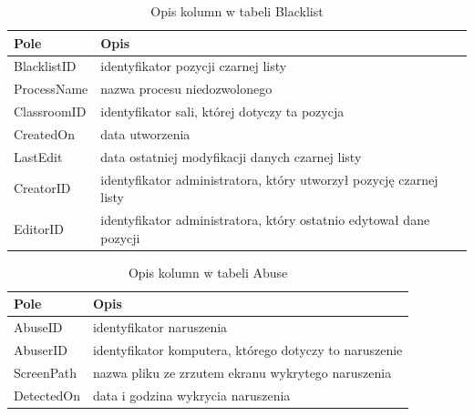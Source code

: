 \begin{table}[!ht]
\caption{\label{tab:blacklist_descr}Opis kolumn w tabeli Blacklist}
\begin{tabular}{| m{3.5cm} | m{10.5cm} |} 

\hline
Pole & Opis\\ \hline

BlacklistID & identyfikator pozycji czarnej listy \\ \hline
ProcessName & nazwa procesu niedozwolonego \\ \hline
ClassroomID & identyfikator sali, której dotyczy ta pozycja \\ \hline
CreatedOn & data utworzenia \\ \hline
LastEdit & data ostatniej modyfikacji danych czarnej listy \\ \hline
CreatorID & identyfikator administratora, który utworzył pozycję czarnej listy \\ \hline
EditorID & identyfikator administratora, który ostatnio edytował dane pozycji\\ \hline

\end{tabular}
\end{table}

\begin{table}[!ht]
\caption{\label{tab:abuse_descr}Opis kolumn w tabeli Abuse}
\begin{tabular}{| m{3.5cm} | m{10.5cm} |} 

\hline
Pole & Opis\\ \hline

AbuseID & identyfikator naruszenia \\ \hline
AbuserID & identyfikator komputera, którego dotyczy to naruszenie \\ \hline
ScreenPath & nazwa pliku ze zrzutem ekranu wykrytego naruszenia \\ \hline
DetectedOn & data i godzina wykrycia naruszenia \\ \hline

\end{tabular}
\end{table}